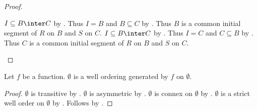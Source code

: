 \begin{proof}
    \begin{byCase}
        $I\subseteq B\inter C$ by .
        Thus $I=B$ and $B\subseteq C$ by .
        Thus $B$ is a common initial segment of $R$ on $B$ and $S$ on $C$.
        $I\subseteq B\inter C$ by .
        Thus $I=C$ and $C\subseteq B$ by .
        Thus $C$ is a common initial segment of $R$ on $B$ and $S$ on $C$.
    \end{byCase}
\end{proof}

\begin{lemma}\label{empty_generated_well_ordering}
    Let $f$ be a function.
    $\emptyset$ is a well ordering generated by $f$ on $\emptyset$.
\end{lemma}
\begin{proof}
    $\emptyset$ is transitive by .
    $\emptyset$ is asymmetric by .
    $\emptyset$ is connex on $\emptyset$ by .
    $\emptyset$ is a strict well order on $\emptyset$
        by .
    Follows by .
\end{proof}

